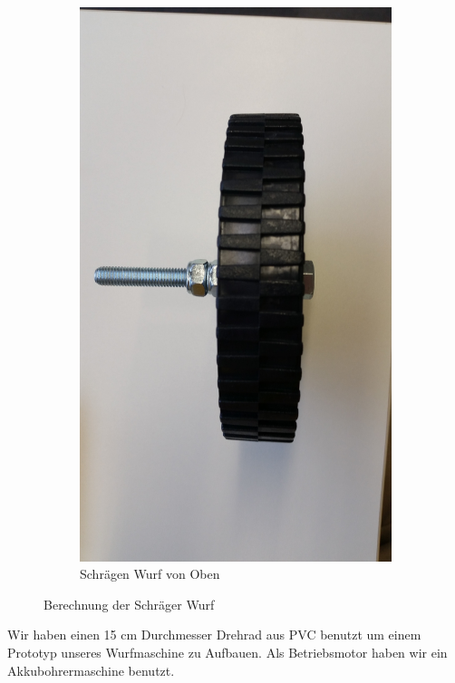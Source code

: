 \begin{figure}[h!]
	\begin{subfigure}{.5\textwidth}
		\includegraphics[width=1\textwidth]{../../fig/Drehrad_1.jpg}
		\caption{Schrägen Wurf von Oben}
		\label{fig:Drehrad}
	\end{subfigure}
	\caption{Berechnung der Schräger Wurf}
	\label{Drehrad Versuch}
\end{figure}
Wir haben einen 15 cm Durchmesser Drehrad aus PVC benutzt um einem Prototyp unseres Wurfmaschine zu Aufbauen. Als Betriebsmotor haben wir ein Akkubohrermaschine benutzt.
